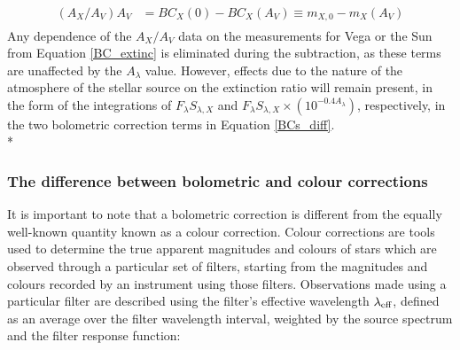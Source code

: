 \documentclass[12pt, a4paper]{report}
\begin{document}
\begin{align}
\begin{split}
\left(A_{X}/A_{V}\right)A_{V} &= BC_{X}(0) - BC_{X}(A_{V}) \equiv m_{X,0} - m_{X}(A_{V})
\label{BCs_diff}
\end{split}
\end{align}
Any dependence of the $A_{X}/A_{V}$ data on the measurements for Vega or the Sun from Equation \ref{BC_extinc} is eliminated during the subtraction, as these terms are unaffected by the $A_{\lambda}$ value. However, effects due to the nature of the atmosphere of the stellar source on the extinction ratio will remain present, in the form of the integrations of $F_{\lambda}S_{\lambda,X}$ and $F_{\lambda}S_{\lambda,X} \times \left( 10^{-0.4 A_{\lambda}} \right)$, respectively, in the two bolometric correction terms in Equation \ref{BCs_diff}. \\*

\subsubsection{The difference between bolometric and colour corrections} \label{colour_corr}
It is important to note that a bolometric correction is different from the equally well-known quantity known as a colour correction. Colour corrections are tools used to determine the true apparent magnitudes and colours of stars which are observed through a particular set of filters, starting from the magnitudes and colours recorded by an instrument using those filters. Observations made using a particular filter are described using the filter's effective wavelength $\lambda_{\textnormal{eff}}$, defined as an average over the filter wavelength interval, weighted by the source spectrum and the filter response function:
\end{document}
